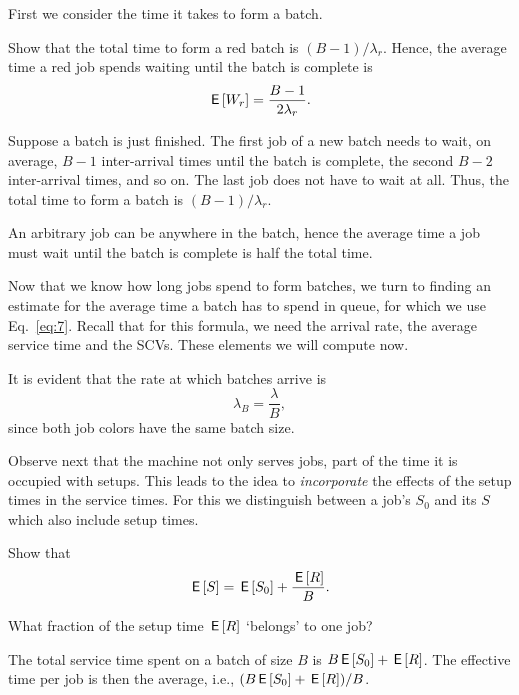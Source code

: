 First we consider the time it takes to form a batch. 
\begin{exercise}[\faFlask]
  Show that the total time to form a red batch is $(B-1)/\lambda_r$. Hence, the average time a red job spends waiting until the batch is complete is
\begin{equation*}
  \,\mathsf{E}\left[W_r\right] = \frac{B-1}{2\lambda_r}.
\end{equation*}
\begin{solution}
  Suppose a batch is just finished. The first job of a new batch needs to wait, on average, $B-1$  inter-arrival times until the batch is complete, the second $B-2$ inter-arrival times, and so on. The last job does not have to wait at all. Thus, the total time to form a batch is $(B-1)/\lambda_r$. 

An arbitrary job can be anywhere in the batch, hence the average time a job must wait until the batch is complete is half the total time. 
\end{solution}
\end{exercise}

Now that we know how long jobs spend to form batches, we turn to finding an estimate for the average time a batch has to spend in queue, for which we use Eq.~\eqref{eq:7}. Recall that for  this formula, we need the arrival rate, the average service time and the SCVs. These elements we will compute now. 

It is evident that the  rate at which batches arrive is 
\begin{equation*}
  \lambda_B = \frac \lambda B,
\end{equation*}
since both job colors have the same batch size.  

Observe next that the machine not only  serves jobs, part of the time it is  occupied with setups. This leads to the idea to  \emph{incorporate} the effects of the setup times in the service times. For this we distinguish between a job's  $S_0$  and its  $S$ which also include setup times. 

\begin{exercise}[\faFlask]
  Show that
  \begin{equation*}
    \,\mathsf{E}\left[S\right] = \,\mathsf{E}\left[S_0\right] + \frac{\,\mathsf{E}\left[R\right]} B.
  \end{equation*}
  \begin{hint}
    What fraction of the setup time $\,\mathsf{E}\left[R\right]$ `belongs' to one job?
  \end{hint}
  \begin{solution}
    The total service time spent on a batch of size $B$ is $B \,\mathsf{E}\left[S_0\right] + \,\mathsf{E}\left[R\right]$. The effective time per job is then the average, i.e.,  $(B \,\mathsf{E}\left[S_0\right]+\,\mathsf{E}\left[R\right])/B$. 
  \end{solution}
\end{exercise}

